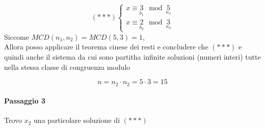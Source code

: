 $$(***)
\begin{cases}
    x\equiv \underset{b_1}{3}\mod \underset{n_1}{5}\\
    x\equiv \underset{b_2}{2}\mod \underset{n_2}{3}
\end{cases}
$$
Siccome $MCD(n_1,n_2)=MCD(5,3)=1$, \\
Allora 
{\color{blue}
    posso applicare il teorema cinese dei resti e concludere che 
}
$(***)$ e quindi anche il sistema da cui sono partit\textschwa{ }ha infinite soluzioni (numeri interi)
tutte nella stessa classe di congruenza modulo 

$$n=n_2\cdot n_2 = 5\cdot 3 = 15$$

\paragraph{Passaggio 3} Trovo $x_2$ una particolare soluzione di $(***)$
